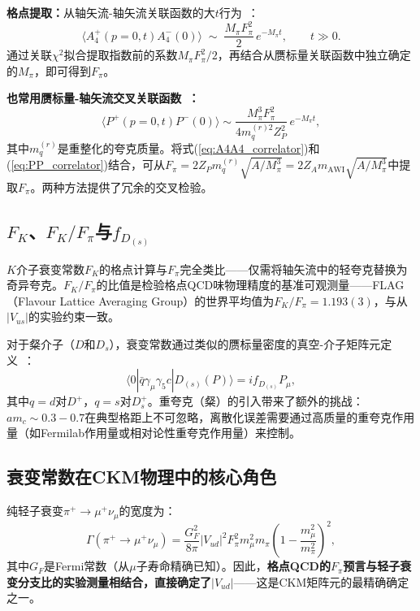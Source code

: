 \documentclass[12pt,a4paper]{ctexart}
\theoremstyle{definition}
\begin{document}
\textbf{格点提取：}从轴矢流-轴矢流关联函数的大$t$行为~\cite{GattringerLang2010}：
\begin{equation}
\langle A_4^+(p=0,t) A_4^-(0) \rangle \;\sim\; \frac{M_\pi F_\pi^2}{2}\, e^{-M_\pi t}, \qquad t \gg 0.
\label{eq:A4A4_correlator}
\end{equation}
通过关联$\chi^2$拟合提取指数前的系数$M_\pi F_\pi^2/2$，再结合从赝标量关联函数中独立确定的$M_\pi$，即可得到$F_\pi$。

\textbf{也常用赝标量-轴矢流交叉关联函数~\cite{GattringerLang2010}：}
\begin{equation}
\langle P^+(p=0,t) P^-(0) \rangle \sim \frac{M_\pi^3 F_\pi^2}{4 m_q^{(r)2} Z_P^2}\, e^{-M_\pi t},
\label{eq:PP_correlator}
\end{equation}
其中$m_q^{(r)}$是重整化的夸克质量。将式(\ref{eq:A4A4_correlator})和(\ref{eq:PP_correlator})结合，可从$F_\pi = 2Z_P m_q^{(r)} \sqrt{A/M_\pi^3} = 2Z_A m_{\text{AWI}}\sqrt{A/M_\pi^3}$中提取$F_\pi$。两种方法提供了冗余的交叉检验。

\subsection{$F_K$、$F_K/F_\pi$与$f_{D_{(s)}}$}

$K$介子衰变常数$F_K$的格点计算与$F_\pi$完全类比——仅需将轴矢流中的轻夸克替换为奇异夸克。$F_K/F_\pi$的比值是检验格点QCD味物理精度的基准可观测量——FLAG（Flavour Lattice Averaging Group）的世界平均值为$F_K/F_\pi = 1.193(3)$，与从$|V_{us}|$的实验约束一致。

对于粲介子（$D$和$D_s$），衰变常数通过类似的赝标量密度的真空-介子矩阵元定义~\cite{CharmedClover}：
\begin{equation}
\boxed{\langle 0 | \bar q \gamma_\mu\gamma_5 c | D_{(s)}(P) \rangle = i f_{D_{(s)}} P_\mu},
\label{eq:fD_def}
\end{equation}
其中$q = d$对$D^+$，$q = s$对$D_s^+$。重夸克（粲）的引入带来了额外的挑战：$am_c \sim 0.3-0.7$在典型格距上不可忽略，离散化误差需要通过高质量的重夸克作用量（如Fermilab作用量或相对论性重夸克作用量）来控制。

\subsection{衰变常数在CKM物理中的核心角色}

纯轻子衰变$\pi^+ \to \mu^+\nu_\mu$的宽度为：
\begin{equation}
\Gamma(\pi^+ \to \mu^+\nu_\mu) = \frac{G_F^2}{8\pi} |V_{ud}|^2 F_\pi^2 m_\mu^2 m_\pi \left(1 - \frac{m_\mu^2}{m_\pi^2}\right)^2,
\label{eq:pion_width}
\end{equation}
其中$G_F$是Fermi常数（从$\mu$子寿命精确已知）。因此，\textbf{格点QCD的$F_\pi$预言与轻子衰变分支比的实验测量相结合，直接确定了$|V_{ud}|$}——这是CKM矩阵元的最精确确定之一。
\end{document}
